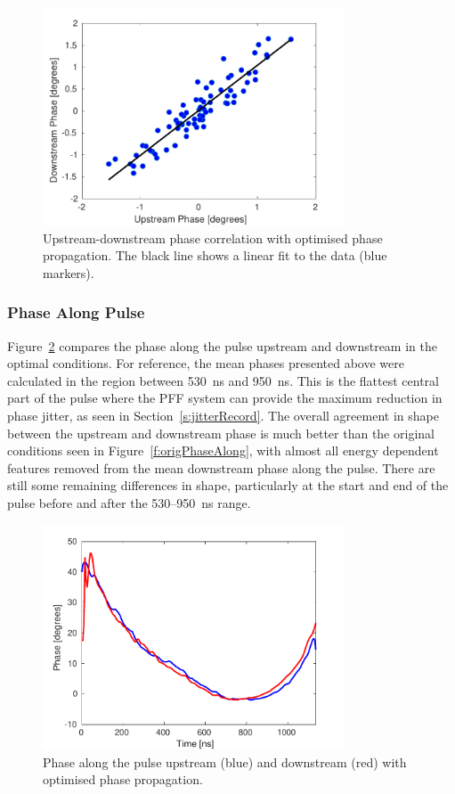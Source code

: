 \begin{figure}
  \centering
  \includegraphics[width=0.8\textwidth]{Figures/propagation/bestProp_meanCorr}
  \caption{Upstream-downstream phase correlation with optimised phase propagation. The black line shows a linear fit to the data (blue markers).}
  \label{f:bestProp_meanCorr}
\end{figure}

\subsubsection{Phase Along Pulse}

Figure~\ref{f:bestProp_meanAlong} compares the phase along the pulse upstream and downstream in the optimal conditions. For reference, the mean phases presented above were calculated in the region between 530~ns and 950~ns. This is the flattest central part of the pulse where the PFF system can provide the maximum reduction in phase jitter, as seen in Section~\ref{s:jitterRecord}. The overall agreement in shape between the upstream and downstream phase is much better than the original conditions seen in Figure~\ref{f:origPhaseAlong}, with almost all energy dependent features removed from the mean downstream phase along the pulse. There are still some remaining differences in shape, particularly at the start and end of the pulse before and after the 530--950~ns range.

\begin{figure}
  \centering
  \includegraphics[width=0.8\textwidth]{Figures/propagation/bestProp_meanAlong}
  \caption{Phase along the pulse upstream (blue) and downstream (red) with optimised phase propagation.}
  \label{f:bestProp_meanAlong}
\end{figure}

